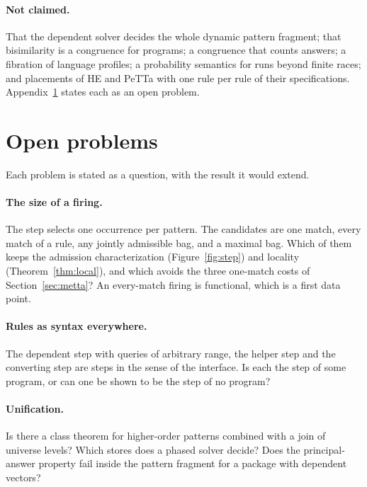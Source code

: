 \documentclass[11pt]{article}
\theoremstyle{plain}
\theoremstyle{definition}
\theoremstyle{remark}
\begin{document}
\paragraph{Not claimed.} That the dependent solver decides the whole dynamic pattern fragment;
that bisimilarity is a congruence for programs; a congruence that counts answers; a fibration of
language profiles; a probability semantics for runs beyond finite races; and placements of HE and
PeTTa with one rule per rule of their specifications. Appendix~\ref{app:open} states each as an
open problem.

\appendix
\section{Open problems}\label{app:open}

Each problem is stated as a question, with the result it would extend.

\paragraph{The size of a firing.} The step selects one occurrence per pattern. The candidates
are one match, every match of a rule, any jointly admissible bag, and a maximal bag. Which of
them keeps the admission characterization (Figure~\ref{fig:step}) and locality
(Theorem~\ref{thm:local}), and which avoids the three one-match costs of
Section~\ref{sec:metta}? An every-match firing is functional, which is a first data point.

\paragraph{Rules as syntax everywhere.} The dependent step with queries of arbitrary range, the
helper step and the converting step are steps in the sense of the interface. Is each the step of
some program, or can one be shown to be the step of no program?

\paragraph{Unification.} Is there a class theorem for higher-order patterns combined with a join
of universe levels? Which stores does a phased solver decide? Does the principal-answer property
fail inside the pattern fragment for a package with dependent vectors?
\end{document}
